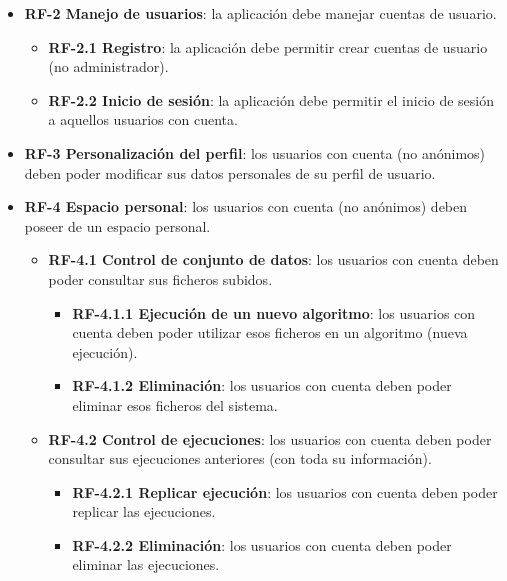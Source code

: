 \begin{itemize}
    \item \textbf{RF-2 Manejo de usuarios}: la aplicación debe manejar cuentas
    de usuario.
    \begin{itemize}
        \item \textbf{RF-2.1 Registro}: la aplicación debe permitir crear
        cuentas de usuario (no administrador).
        \item \textbf{RF-2.2 Inicio de sesión}: la aplicación debe permitir el
        inicio de sesión a aquellos usuarios con cuenta.
    \end{itemize}
    \item \textbf{RF-3 Personalización del perfil}: los usuarios con cuenta (no
    anónimos) deben poder modificar sus datos personales de su perfil de
    usuario.

    \item \textbf{RF-4 Espacio personal}: los usuarios con cuenta (no anónimos)
    deben poseer de un espacio personal.
    \begin{itemize}
        \item \textbf{RF-4.1 Control de conjunto de datos}: los usuarios con
        cuenta deben poder consultar sus ficheros subidos.
        \begin{itemize}
            \item \textbf{RF-4.1.1 Ejecución de un nuevo algoritmo}: los
            usuarios con cuenta deben poder utilizar esos ficheros en un
            algoritmo (nueva ejecución).
            
            \item \textbf{RF-4.1.2 Eliminación}: los usuarios con cuenta deben
            poder eliminar esos ficheros del sistema.
        \end{itemize}
        \item \textbf{RF-4.2 Control de ejecuciones}:  los usuarios con cuenta
        deben poder consultar sus ejecuciones anteriores (con toda su
        información).
        \begin{itemize}
            \item \textbf{RF-4.2.1 Replicar ejecución}: los usuarios con cuenta
            deben poder replicar las ejecuciones.
            
            \item \textbf{RF-4.2.2 Eliminación}: los usuarios con cuenta deben
            poder eliminar las ejecuciones.
        \end{itemize}
    \end{itemize}


\end{itemize}
